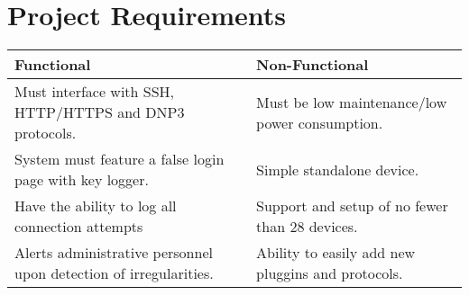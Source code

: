 \section*{\color{NavyBlue}Project Requirements}

\large

\begin{center}
\setlength{\tabcolsep}{18pt}
\renewcommand{\arraystretch}{1.4}
\begin{tabularx}{\linewidth}{X X}
\textbf{Functional} & \textbf{Non-Functional} \\
\midrule
Must interface with SSH, HTTP/HTTPS and DNP3 protocols. & Must be low maintenance/low power consumption. \\
System must feature a false login page with key logger. & Simple standalone device. \\
Have the ability to log all connection attempts & Support and setup of no fewer than 28 devices. \\
Alerts administrative personnel upon detection of irregularities. & Ability to easily add new pluggins and protocols. \\
\end{tabularx}
\end{center}
